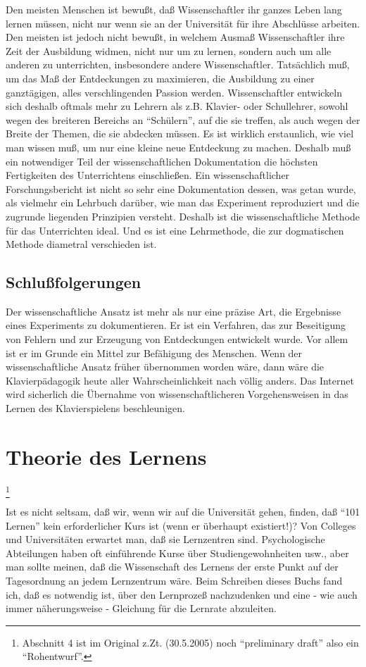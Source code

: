 Den meisten Menschen ist bewußt, daß Wissenschaftler ihr ganzes Leben lang lernen müssen, nicht nur wenn sie an der Universität für ihre Abschlüsse arbeiten.
Den meisten ist jedoch nicht bewußt, in welchem Ausmaß Wissenschaftler ihre Zeit der Ausbildung widmen, nicht nur um zu lernen, sondern auch um alle anderen zu unterrichten, insbesondere andere Wissenschaftler.
Tatsächlich muß, um das Maß der Entdeckungen zu maximieren, die Ausbildung zu einer ganztägigen, alles verschlingenden Passion werden.
Wissenschaftler entwickeln sich deshalb oftmals mehr zu Lehrern als z.B. Klavier- oder Schullehrer, sowohl wegen des breiteren Bereichs an \enquote{Schülern}, auf die sie treffen, als auch wegen der Breite der Themen, die sie abdecken müssen.
Es ist wirklich erstaunlich, wie viel man wissen muß, um nur eine kleine neue Entdeckung zu machen.
Deshalb muß ein notwendiger Teil der wissenschaftlichen Dokumentation die höchsten Fertigkeiten des Unterrichtens einschließen.
Ein wissenschaftlicher Forschungsbericht ist nicht so sehr eine Dokumentation dessen, was getan wurde, als vielmehr ein Lehrbuch darüber, wie man das Experiment reproduziert und die zugrunde liegenden Prinzipien versteht.
Deshalb ist die wissenschaftliche Methode für das Unterrichten ideal.
Und es ist eine Lehrmethode, die zur dogmatischen Methode diametral verschieden ist.


\subsection{Schlußfolgerungen}
\label{c3_3h}

Der wissenschaftliche Ansatz ist mehr als nur eine präzise Art, die Ergebnisse eines Experiments zu dokumentieren.
Er ist ein Verfahren, das zur Beseitigung von Fehlern und zur Erzeugung von Entdeckungen entwickelt wurde.
Vor allem ist er im Grunde ein Mittel zur Befähigung des Menschen.
Wenn der wissenschaftliche Ansatz früher übernommen worden wäre, dann wäre die Klavierpädagogik heute aller Wahrscheinlichkeit nach völlig anders.
Das Internet wird sicherlich die Übernahme von wissenschaftlicheren Vorgehensweisen in das Lernen des Klavierspielens beschleunigen.
 

\section{Theorie des Lernens}
\label{c3_4}

\footnote{Abschnitt 4 ist im Original z.Zt. (30.5.2005) noch \enquote{preliminary draft} also ein \enquote{Rohentwurf}.}

Ist es nicht seltsam, daß wir, wenn wir auf die Universität gehen, finden, daß \enquote{101 Lernen} kein erforderlicher Kurs ist (wenn er überhaupt existiert!)?
Von Colleges und Universitäten erwartet man, daß sie Lernzentren sind.
Psychologische Abteilungen haben oft einführende Kurse über Studiengewohnheiten usw., aber man sollte meinen, daß die Wissenschaft des Lernens der erste Punkt auf der Tagesordnung an jedem Lernzentrum wäre.
Beim Schreiben dieses Buchs fand ich, daß es notwendig ist, über den Lernprozeß nachzudenken und eine - wie auch immer näherungsweise - Gleichung für die Lernrate abzuleiten.
 


